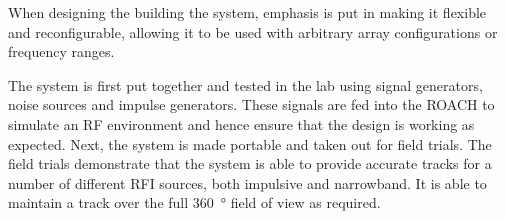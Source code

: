 When designing the building the system, emphasis is put in making it flexible and reconfigurable, allowing it to be used with arbitrary array configurations or frequency ranges.

The system is first put together and tested in the lab using signal generators, noise sources and impulse generators. These signals are fed into the ROACH to simulate an RF environment and hence ensure that the design is working as expected. Next, the system is made portable and taken out for field trials. The field trials demonstrate that the system is able to provide accurate tracks for a number of different RFI sources, both impulsive and narrowband. It is able to maintain a track over the full \SI{360}{\degree} field of view as required.
